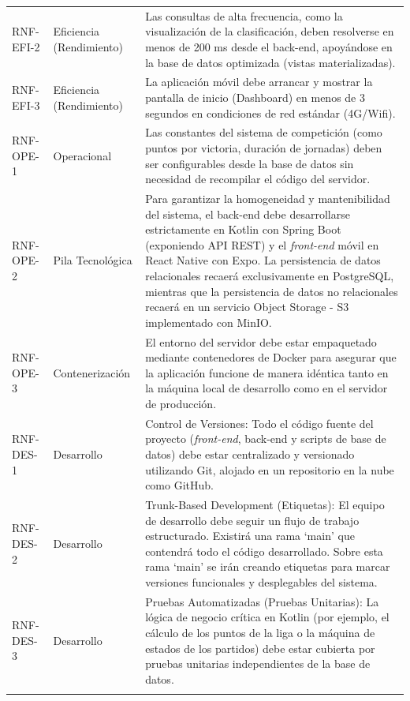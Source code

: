 {\begin{xltabular}{\textwidth}{>{\RaggedRight}p{1.7cm} p{1.8cm} >{\RaggedRight\arraybackslash}X}
        RNF-EFI-2 & Eficiencia (Rendimiento) & Las consultas de alta frecuencia, como la visualización de la clasificación, deben resolverse en menos de 200 ms desde el back-end, apoyándose en la base de datos optimizada (vistas materializadas). \\ \lightrule
        RNF-EFI-3 & Eficiencia (Rendimiento) & La aplicación móvil debe arrancar y mostrar la pantalla de inicio (Dashboard) en menos de 3 segundos en condiciones de red estándar (4G/Wifi). \\ \lightrule
        RNF-OPE-1 & Operacional & Las constantes del sistema de competición (como puntos por victoria, duración de jornadas) deben ser configurables desde la base de datos sin necesidad de recompilar el código del servidor. \\ \lightrule
        RNF-OPE-2 & Pila Tecnológica & Para garantizar la homogeneidad y mantenibilidad del sistema, el back-end debe desarrollarse estrictamente en Kotlin con Spring Boot (exponiendo API REST) y el \emph{front-end} móvil en React Native con Expo. La persistencia de datos relacionales recaerá exclusivamente en PostgreSQL, mientras que la persistencia de datos no relacionales recaerá en un servicio Object Storage - S3 implementado con MinIO. \\ \lightrule
        RNF-OPE-3 & Contenerización & El entorno del servidor debe estar empaquetado mediante contenedores de Docker para asegurar que la aplicación funcione de manera idéntica tanto en la máquina local de desarrollo como en el servidor de producción. \\ \lightrule
        RNF-DES-1 & Desarrollo & Control de Versiones: Todo el código fuente del proyecto (\emph{front-end}, back-end y scripts de base de datos) debe estar centralizado y versionado utilizando Git, alojado en un repositorio en la nube como GitHub. \\ \lightrule
        RNF-DES-2 & Desarrollo & Trunk-Based Development (Etiquetas): El equipo de desarrollo debe seguir un flujo de trabajo estructurado. Existirá una rama `main' que contendrá todo el código desarrollado. Sobre esta rama `main' se irán creando etiquetas para marcar versiones funcionales y desplegables del sistema. \\ \lightrule
        RNF-DES-3 & Desarrollo & Pruebas Automatizadas (Pruebas Unitarias): La lógica de negocio crítica en Kotlin (por ejemplo, el cálculo de los puntos de la liga o la máquina de estados de los partidos) debe estar cubierta por pruebas unitarias independientes de la base de datos. \\ \lightrule

\end{xltabular}}
